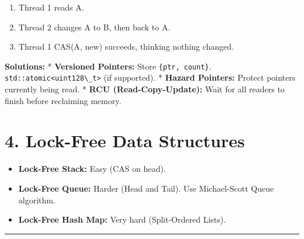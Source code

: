 \begin{enumerate}
\def\labelenumi{\arabic{enumi}.}
\tightlist
\item
  Thread 1 reads A.
\item
  Thread 2 changes A to B, then back to A.
\item
  Thread 1 CAS(A, new) succeeds, thinking nothing changed.
\end{enumerate}

\textbf{Solutions:} * \textbf{Versioned Pointers:} Store
\passthrough{\lstinline!\{ptr, count\}!}.
\passthrough{\lstinline!std::atomic<uint128\_t>!} (if supported). *
\textbf{Hazard Pointers:} Protect pointers currently being read. *
\textbf{RCU (Read-Copy-Update):} Wait for all readers to finish before
reclaiming memory.

\hypertarget{lock-free-data-structures}{%
\section{4. Lock-Free Data Structures}\label{lock-free-data-structures}}

\begin{itemize}
\tightlist
\item
  \textbf{Lock-Free Stack:} Easy (CAS on head).
\item
  \textbf{Lock-Free Queue:} Harder (Head and Tail). Use Michael-Scott
  Queue algorithm.
\item
  \textbf{Lock-Free Hash Map:} Very hard (Split-Ordered Lists).
\end{itemize}

\begin{center}\rule{0.5\linewidth}{0.5pt}\end{center}
